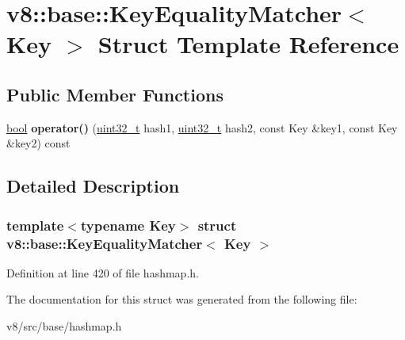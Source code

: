 \hypertarget{structv8_1_1base_1_1KeyEqualityMatcher}{}\section{v8\+:\+:base\+:\+:Key\+Equality\+Matcher$<$ Key $>$ Struct Template Reference}
\label{structv8_1_1base_1_1KeyEqualityMatcher}
\subsection*{Public Member Functions}
\begin{DoxyCompactItemize}
\item 
\mbox{\label{structv8_1_1base_1_1KeyEqualityMatcher_a136b8781f586347c5a96f006b44ff92a}} 
\mbox{\hyperlink{classbool}{bool}} {\bfseries operator()} (\mbox{\hyperlink{classuint32__t}{uint32\+\_\+t}} hash1, \mbox{\hyperlink{classuint32__t}{uint32\+\_\+t}} hash2, const Key \&key1, const Key \&key2) const
\end{DoxyCompactItemize}


\subsection{Detailed Description}
\subsubsection*{template$<$typename Key$>$\newline
struct v8\+::base\+::\+Key\+Equality\+Matcher$<$ Key $>$}



Definition at line 420 of file hashmap.\+h.



The documentation for this struct was generated from the following file\+:\begin{DoxyCompactItemize}
\item 
v8/src/base/hashmap.\+h\end{DoxyCompactItemize}

